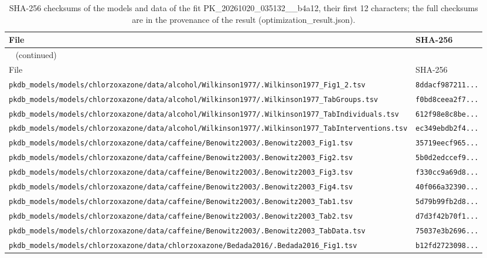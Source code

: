 \begin{longtable}{ll}
\caption{SHA-256 checksums of the models and data of the fit PK\_20261020\_035132\_\_b4a12, their first 12 characters; the full checksums are in the provenance of the result (optimization\_result.json).}\label{tab:checksums:PK_20261020_035132__b4a12} \\
\toprule
File & SHA-256 \\
\midrule
\endfirsthead
\multicolumn{2}{l}{\small\tablename~\thetable{} (continued)} \\
\toprule
File & SHA-256 \\
\midrule
\endhead
\bottomrule
\endlastfoot
\texttt{pkdb\_models/models/chlorzoxazone/data/alcohol/Wilkinson1977/.Wilkinson1977\_Fig1\_2.tsv} & \texttt{8ddacf987211...} \\
\texttt{pkdb\_models/models/chlorzoxazone/data/alcohol/Wilkinson1977/.Wilkinson1977\_TabGroups.tsv} & \texttt{f0bd8ceea2f7...} \\
\texttt{pkdb\_models/models/chlorzoxazone/data/alcohol/Wilkinson1977/.Wilkinson1977\_TabIndividuals.tsv} & \texttt{612f98e8c8be...} \\
\texttt{pkdb\_models/models/chlorzoxazone/data/alcohol/Wilkinson1977/.Wilkinson1977\_TabInterventions.tsv} & \texttt{ec349ebdb2f4...} \\
\texttt{pkdb\_models/models/chlorzoxazone/data/caffeine/Benowitz2003/.Benowitz2003\_Fig1.tsv} & \texttt{35719eecf965...} \\
\texttt{pkdb\_models/models/chlorzoxazone/data/caffeine/Benowitz2003/.Benowitz2003\_Fig2.tsv} & \texttt{5b0d2edccef9...} \\
\texttt{pkdb\_models/models/chlorzoxazone/data/caffeine/Benowitz2003/.Benowitz2003\_Fig3.tsv} & \texttt{f330cc9a69d8...} \\
\texttt{pkdb\_models/models/chlorzoxazone/data/caffeine/Benowitz2003/.Benowitz2003\_Fig4.tsv} & \texttt{40f066a32390...} \\
\texttt{pkdb\_models/models/chlorzoxazone/data/caffeine/Benowitz2003/.Benowitz2003\_Tab1.tsv} & \texttt{5d79b99fb2d8...} \\
\texttt{pkdb\_models/models/chlorzoxazone/data/caffeine/Benowitz2003/.Benowitz2003\_Tab2.tsv} & \texttt{d7d3f42b70f1...} \\
\texttt{pkdb\_models/models/chlorzoxazone/data/caffeine/Benowitz2003/.Benowitz2003\_TabData.tsv} & \texttt{75037e3b2696...} \\
\texttt{pkdb\_models/models/chlorzoxazone/data/chlorzoxazone/Bedada2016/.Bedada2016\_Fig1.tsv} & \texttt{b12fd2723098...} \\

\end{longtable}
